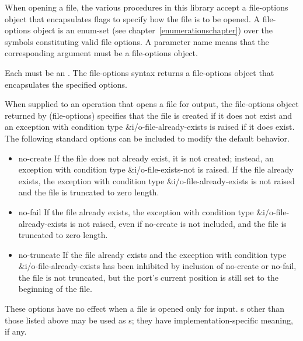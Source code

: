 When opening a file, the various procedures in this library accept a
{\cf file-options} object that encapsulates flags to specify how
the file is to be opened. A {\cf file-options} object is an enum-set
(see chapter~\ref{enumerationschapter}) over the symbols constituting
valid file options.
A  parameter name means that the
corresponding argument must be a file-options object.

\begin{entry}{%
}

Each  must be an .
The {\cf file-options} syntax returns a file-options object that 
encapsulates the
specified options.

When supplied to an operation that opens a file for output, the
file-options object returned by {\cf (file-options)} specifies that the
file is created if it does not exist and an exception with condition type
{\cf\&i/o-file-already-exists} is raised if it does exist.
The following standard options can be included to modify the default behavior.

\begin{itemize}   
\item {\cf no-create}
      If the file does not already exist, it is not created;
      instead, an exception with condition type {\cf\&i/o-file-exists-not}
      is raised.
      If the file already exists, the exception with condition type
      {\cf\&i/o-file-already-exists} is not raised
      and the file is truncated to zero length.
\item {\cf no-fail}
      If the file already exists, the exception with condition type
      {\cf\&i/o-file-already-exists} is not raised,
      even if {\cf no-create} is not included,
      and the file is truncated to zero length.
\item {\cf no-truncate}
      If the file already exists and the exception with condition type
      {\cf\&i/o-file-already-exists} has been inhibited by inclusion of
      {\cf no-create} or {\cf no-fail}, the file is not truncated, but
      the port's current position is still set to the beginning of the
      file.
\end{itemize}

These options have no effect when a file is opened only for input.
s
other than those listed above may be used as s;
they have implementation-specific meaning, if any.

\begin{rationale}
\end{rationale}
\end{entry}   

